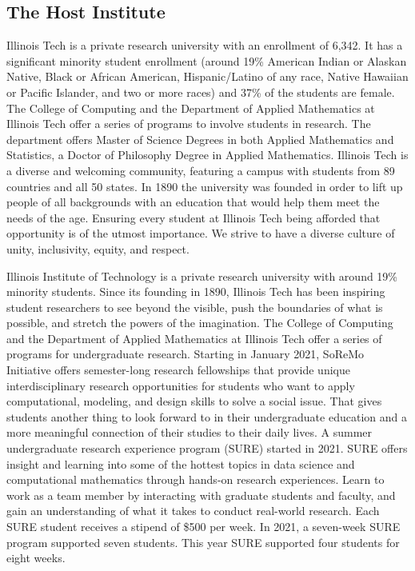 \documentclass[11pt]{NSFamsart}
\begin{document}
\subsection{The Host Institute}
Illinois Tech is a private research university with an enrollment of 6,342. It has a significant minority student enrollment (around 19\% American Indian or Alaskan Native, Black or African American, Hispanic/Latino of any race, Native Hawaiian or Pacific Islander, and two or more races) and 37\% of the students are female. The College of Computing
and the Department of Applied Mathematics at Illinois Tech offer a series of programs to involve students
in research. The department offers Master of Science Degrees
in both Applied Mathematics and Statistics, a Doctor of Philosophy Degree in Applied Mathematics.  Illinois Tech is a diverse and welcoming community, featuring a campus with students from 89 countries and all 50 states. In 1890 the university was founded in order to lift up people of all backgrounds with an education that would help them meet the needs of the age. Ensuring every student at Illinois Tech being afforded that opportunity is of the utmost importance.
We strive to have a diverse culture of unity, inclusivity, equity, and respect.


Illinois Institute of Technology is a private research university with around 19\% minority students. Since its founding in 1890, Illinois Tech has been inspiring student researchers to see beyond the visible, push the boundaries of what is possible, and stretch the powers of the imagination. The College of Computing and the Department of Applied Mathematics at Illinois Tech offer a series of programs for undergraduate research. Starting in January 2021, SoReMo Initiative offers semester-long research fellowships that provide unique interdisciplinary research opportunities for students who want to apply computational, modeling, and design skills to solve a social issue. That gives students another thing to look forward to in their undergraduate education and a more meaningful connection of their studies to their daily lives. A summer undergraduate research experience program (SURE) started in 2021. SURE offers insight and learning into some of the hottest topics in data science and computational mathematics through hands-on research experiences. Learn to work as a team member by interacting with graduate students and faculty, and gain an understanding of what it takes to conduct real-world research. Each SURE student receives a stipend of \$500 per week. In 2021, a seven-week SURE program supported seven students. This year SURE supported four students for eight weeks. 
\end{document}

